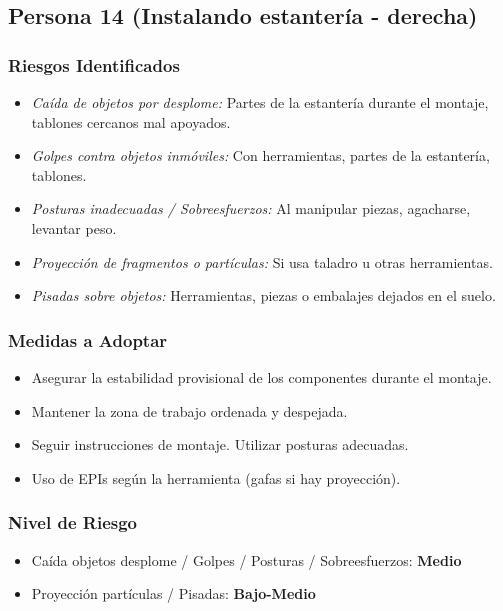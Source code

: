 \documentclass[12pt,a4paper]{article}
\begin{document}
	\bigskip\hrulefill\bigskip
	
	\subsection{Persona 14 (Instalando estantería - derecha)}
	
	\subsubsection{Riesgos Identificados}
	\begin{itemize}
		\item \textit{Caída de objetos por desplome:} Partes de la estantería durante el montaje, tablones cercanos mal apoyados.
		\item \textit{Golpes contra objetos inmóviles:} Con herramientas, partes de la estantería, tablones.
		\item \textit{Posturas inadecuadas / Sobreesfuerzos:} Al manipular piezas, agacharse, levantar peso.
		\item \textit{Proyección de fragmentos o partículas:} Si usa taladro u otras herramientas.
		\item \textit{Pisadas sobre objetos:} Herramientas, piezas o embalajes dejados en el suelo.
	\end{itemize}
	
	\subsubsection{Medidas a Adoptar}
	\begin{itemize}
		\item Asegurar la estabilidad provisional de los componentes durante el montaje.
		\item Mantener la zona de trabajo ordenada y despejada.
		\item Seguir instrucciones de montaje. Utilizar posturas adecuadas.
		\item Uso de EPIs según la herramienta (gafas si hay proyección).
	\end{itemize}
	
	\subsubsection{Nivel de Riesgo}
	\begin{itemize}
		\item Caída objetos desplome / Golpes / Posturas / Sobreesfuerzos: \textbf{Medio}
		\item Proyección partículas / Pisadas: \textbf{Bajo-Medio}
	\end{itemize}
	
\end{document}
